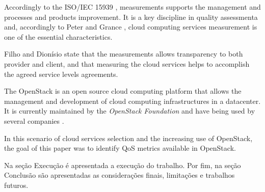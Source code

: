 \documentclass[conference]{IEEEtran}
\begin{document}

Accordingly to the ISO/IEC 15939 \cite{iso15939}, measurements supports the management and processes and products improvement. It is a
key discipline in quality assessmenta and, accordingly to Peter and Grance \cite{mell2011nist}, cloud computing services measurement is 
one of the essential characteristics.


Filho and Dionísio \cite{leite2016influencia} state that the measurements allows transparency to both provider and client, and that measuring the 
cloud services helps to accomplish the agreed service levels agreements.


The OpenStack \cite{openstack_general} is an open source cloud computing platform that allows the management and development of 
cloud computing infrastructures in a datacenter. It is currently maintained by the \textit{OpenStack Foundation} and have being used by several
companies \cite{openstack} \cite{bui2016}.


In this scenario of cloud services selection and the increasing use of OpenStack, the goal of this paper was to identify QoS metrics
available in OpenStack.

Na seção Execução é apresentada a execução do trabalho.
Por fim, na seção Conclusão são apresentadas as considerações finais, limitações e trabalhos futuros.
\end{document}
